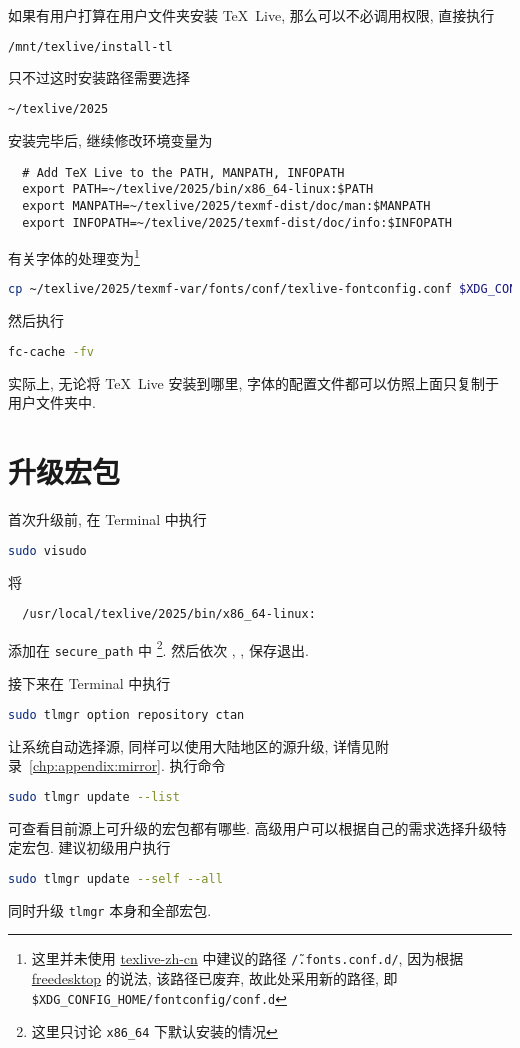如果有用户打算在用户文件夹安装 \TeX\ Live,
那么可以不必调用权限,
直接执行
\begin{lstlisting}[language=bash]
  /mnt/texlive/install-tl
\end{lstlisting}
只不过这时安装路径需要选择
\begin{lstlisting}[language=bash]
  ~/texlive/2025
\end{lstlisting}
安装完毕后,
继续修改环境变量为
\begin{lstlisting}
  # Add TeX Live to the PATH, MANPATH, INFOPATH
  export PATH=~/texlive/2025/bin/x86_64-linux:$PATH
  export MANPATH=~/texlive/2025/texmf-dist/doc/man:$MANPATH
  export INFOPATH=~/texlive/2025/texmf-dist/doc/info:$INFOPATH
\end{lstlisting}
有关字体的处理变为\footnote{这里并未使用 \href{https://tug.org/texlive/doc/texlive-zh-cn/texlive-zh-cn.pdf}{texlive-zh-cn} 中建议的路径 \texttt{\~/.fonts.conf.d/},
因为根据 \href{https://www.freedesktop.org/software/fontconfig/fontconfig-user.html}{freedesktop} 的说法,
该路径已废弃,
故此处采用新的路径,
即 \texttt{\$XDG\_CONFIG\_HOME/fontconfig/conf.d}}
\begin{lstlisting}[language=bash]
  cp ~/texlive/2025/texmf-var/fonts/conf/texlive-fontconfig.conf $XDG_CONFIG_HOME/fontconfig/conf.d/09-texlive.conf
\end{lstlisting}
然后执行
\begin{lstlisting}[language=bash]
  fc-cache -fv
\end{lstlisting}
实际上,
无论将 \TeX\ Live 安装到哪里,
字体的配置文件都可以仿照上面只复制于用户文件夹中.

\section{升级宏包}\label{sec:ubuntu:update}

首次升级前,
在 \textsf{Terminal} 中执行
\begin{lstlisting}[language = bash]
  sudo visudo
\end{lstlisting}
将
\begin{lstlisting}
  /usr/local/texlive/2025/bin/x86_64-linux:
\end{lstlisting}
添加在 \texttt{secure\_path} 中%
\footnote{这里只讨论 \texttt{x86\_64} 下默认安装的情况}.
然后依次 , , \keys{\enter} 保存退出.

接下来在 \textsf{Terminal} 中执行
\begin{lstlisting}[language = bash]
  sudo tlmgr option repository ctan
\end{lstlisting}
让系统自动选择源,
同样可以使用大陆地区的源升级,
详情见附录~\ref{chp:appendix:mirror}.
执行命令
\begin{lstlisting}[language = bash]
  sudo tlmgr update --list
\end{lstlisting}
可查看目前源上可升级的宏包都有哪些. 
高级用户可以根据自己的需求选择升级特定宏包.
建议初级用户执行
\begin{lstlisting}[language = bash]
  sudo tlmgr update --self --all
\end{lstlisting}
同时升级 \texttt{tlmgr} 本身和全部宏包. 

